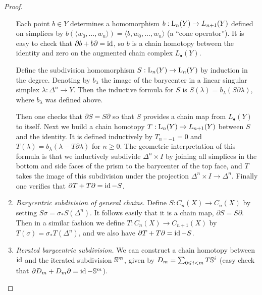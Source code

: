 \begin{proof}
\begin{enumerate}
         Each point $b\in Y$ determines a homomorphism $b:\mathrm{L}_n(Y)\to L_{n+1}(Y)$ defined on simplices by $b(\langle w_0,\ldots,w_n\rangle)=\langle b,w_0,\ldots,w_n\rangle$ (a ``cone operator''). It is easy to check that $\partial b+b\partial =\operatorname{id}$, so $b$ is a chain homotopy between the identity and zero on the augmented chain complex $L_\bullet(Y)$.
         
         Define the subdivision homomorphism $S:\mathrm{L}_n(Y)\to \mathrm{L}_n(Y)$ by induction in the degree. Denoting by $b_\lambda$ the image of the barycenter in a linear singular simplex $\lambda:\Delta^n\to Y$. Then the inductive formula for $S$ is $S(\lambda)=b_\lambda(S\partial\lambda)$, where $b_\lambda$ was defined above.
         
         Then one checks that $\partial S=S\partial$ so that $S$ provides a chain map from $L_\bullet(Y)$ to itself. Next we build a chain homotopy $T:\mathrm{L}_n(Y)\to L_{n+1}(Y)$ between $S$ and the identity. It is defined inductively by $T_{n=-1}=0$ and $T(\lambda)=b_\lambda(\lambda-T\partial\lambda)$ for $n\geq 0$. The geometric interpretation of this formula is that we inductively subdivide $\Delta^n\times I$ by joining all simplices in the bottom and side faces of the prism to the barycenter of the top face, and $T$ takes the image of this subdivision under the projection $\Delta^n\times I\to \Delta^n$. Finally one verifies that $\partial T+T\partial=\operatorname{id}-S$.
         
         \item \emph{Barycentric subdivision of general chains.} Define $S:C_n(X)\to C_n(X)$ by setting $S\sigma=\sigma_\ast S(\Delta^n)$. It follows easily that it is a chain map, $\partial S=S\partial$. Then in a similar fashion we define $T:C_n(X)\to C_{n+1}(X)$ by $T(\sigma)=\sigma_\ast T(\Delta^n)$, and we also have $\partial T+T\partial =\operatorname{id} -S$.
         
         \item \emph{Iterated barycentric subdivision.} We can construct a chain homotopy between $\operatorname{id}$ and the iterated subdivision $\mathbb{S}^m$, given by $D_m=\sum _{0\leqslant i<m}T\mathbb{S}^i$ (easy check that $\partial D_m+D_m\partial=\operatorname{id} -\mathbb{S}^m$). 
         

\end{enumerate}
\end{proof}
